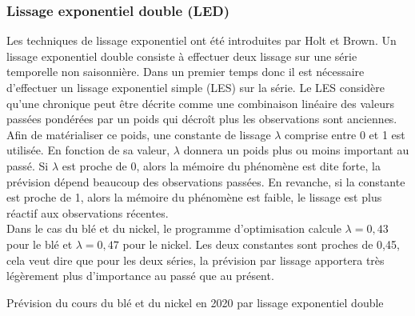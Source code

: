 \subsubsection*{Lissage exponentiel double (LED)}
Les techniques de lissage exponentiel ont été introduites par Holt et Brown. Un lissage exponentiel double consiste à effectuer deux lissage sur une série temporelle 
non saisonnière. Dans un premier temps donc il est nécessaire d'effectuer un lissage exponentiel simple (LES) sur la série. Le LES considère qu'une chronique peut être
décrite comme une combinaison linéaire des valeurs passées pondérées par un poids qui décroît plus les observations sont anciennes. \\[11pt]
Afin de matérialiser ce poids, une  constante de lissage $\lambda$ comprise entre 0 et 1 est utilisée. En fonction de sa valeur, $\lambda$ donnera un poids plus ou moins 
important au passé. Si $ \lambda $ est proche de 0, alors la mémoire du phénomène est dite forte, la prévision dépend beaucoup des observations passées. En revanche, si la 
constante est proche de 1, alors la mémoire du phénomène est faible, le lissage est plus réactif aux observations récentes.\\[11pt]
Dans le cas du blé et du nickel, le programme d'optimisation calcule $ \lambda = 0,43 $ pour le blé et $ \lambda = 0,47 $ pour le nickel. Les deux constantes sont
proches de 0,45, cela veut dire que pour les deux séries, la prévision par lissage apportera très légèrement plus d'importance au passé que au présent.
\begin{table}[H]
    \centering
    \caption{Prévision du cours du blé et du nickel en 2020 par lissage exponentiel double}
    \sffamily
    
\end{table}



